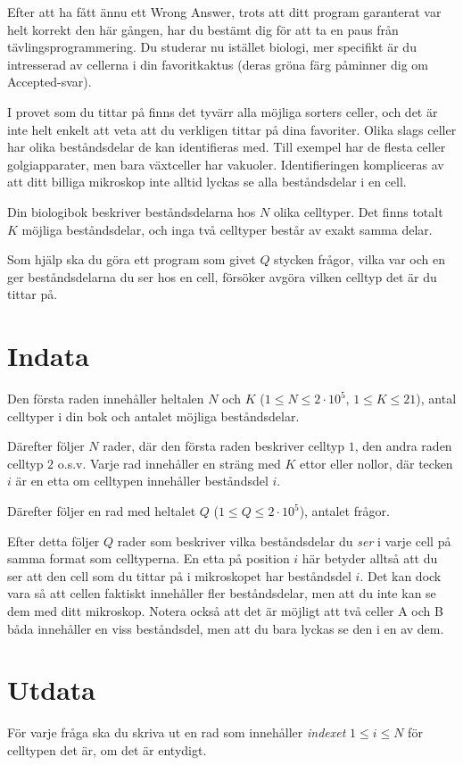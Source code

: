 Efter att ha fått ännu ett Wrong Answer, trots att ditt program garanterat var helt korrekt den här gången, har du bestämt dig för att ta en paus från tävlingsprogrammering.
Du studerar nu istället biologi, mer specifikt är du intresserad av cellerna i din favoritkaktus (deras gröna färg påminner dig om Accepted-svar).

I provet som du tittar på finns det tyvärr alla möjliga sorters celler, och det är inte helt enkelt att veta att du verkligen tittar på dina favoriter.
Olika slags celler har olika beståndsdelar de kan identifieras med.
Till exempel har de flesta celler golgiapparater, men bara växtceller har vakuoler.
Identifieringen kompliceras av att ditt billiga mikroskop inte alltid lyckas se alla beståndsdelar i en cell.

Din biologibok beskriver beståndsdelarna hos $N$ olika celltyper.
Det finns totalt $K$ möjliga beståndsdelar, och inga två celltyper består av exakt samma delar.

Som hjälp ska du göra ett program som givet $Q$ stycken frågor, vilka var och en ger beståndsdelarna du ser hos en cell, försöker avgöra vilken celltyp det är du tittar på.

\section*{Indata}
Den första raden innehåller heltalen $N$ och $K$ ($1 \leq N \leq 2 \cdot 10^5$, $1 \leq K \leq 21$), antal celltyper i din bok och antalet möjliga beståndsdelar. 

Därefter följer $N$ rader, där den första raden beskriver celltyp $1$, den andra raden celltyp $2$ o.s.v.
Varje rad innehåller en sträng med $K$ ettor eller nollor, där tecken $i$ är en etta om celltypen innehåller beståndsdel $i$. 

Därefter följer en rad med heltalet $Q$ ($1 \leq Q \leq 2\cdot 10^5$), antalet frågor. 

Efter detta följer $Q$ rader som beskriver vilka beståndsdelar du \textit{ser} i varje cell på samma format som celltyperna.
En etta på position $i$ här betyder alltså att du ser att den cell som du tittar på i mikroskopet har beståndsdel $i$.
Det kan dock vara så att cellen faktiskt innehåller fler beståndsdelar, men att du inte kan se dem med ditt mikroskop.
Notera också att det är möjligt att två celler A och B båda innehåller en viss beståndsdel, men att du
bara lyckas se den i en av dem.

\section*{Utdata}
För varje fråga ska du skriva ut en rad som innehåller \textit{indexet} $1 \leq i \leq N$ för celltypen det är, om det är entydigt.

